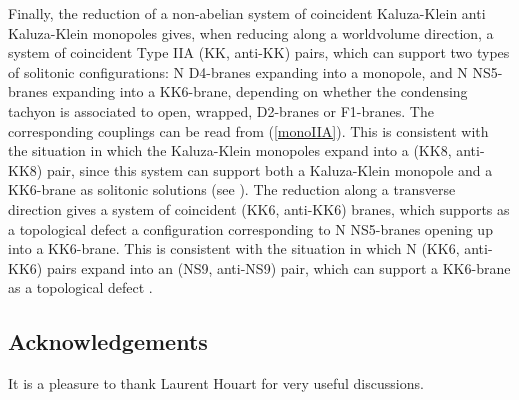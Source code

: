 \documentclass[12pt,a4paper]{article}
\begin{document}
Finally, the reduction of a non-abelian system of coincident Kaluza-Klein
anti Kaluza-Klein monopoles gives, when reducing along a worldvolume
direction, a system of coincident Type IIA (KK, anti-KK) pairs, which
can support two types of solitonic configurations: N D4-branes
expanding into a monopole, and N NS5-branes expanding into a KK6-brane,
depending on whether the condensing tachyon is associated to open,
wrapped, D2-branes or F1-branes. 
The corresponding couplings can be read from (\ref{monoIIA}). 
This is consistent with the situation in which the Kaluza-Klein
monopoles expand into a (KK8, anti-KK8) pair, since this system can
support both a Kaluza-Klein monopole and a KK6-brane as solitonic
solutions (see \cite{HL1}).
The reduction along a transverse direction gives a system
of coincident (KK6, anti-KK6) branes, which supports as a topological
defect a configuration corresponding to N NS5-branes opening up
into a KK6-brane. This is consistent with the situation in which
N (KK6, anti-KK6) pairs expand into an (NS9, anti-NS9) pair, which can
support a KK6-brane as a topological defect \cite{HL1}.



 
\subsection*{Acknowledgements}

It is a pleasure to thank Laurent Houart for very useful discussions.
\end{document}
